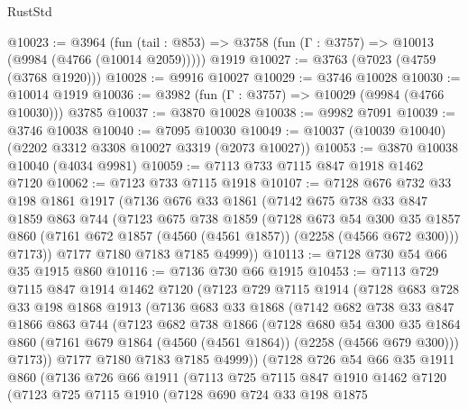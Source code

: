 \begin{lexlean}{RustStd}
\begin{coremodule}
@10023 := @3964
    (fun (tail : @853) => @3758 (fun (Γ : @3757) => @10013 (@9984 (@4766 (@10014 @2059)))))
    @1919
@10027 := @3763 (@7023 (@4759 (@3768 @1920)))
@10028 := @9916 @10027
@10029 := @3746 @10028
@10030 := @10014 @1919
@10036 := @3982 (fun (Γ : @3757) => @10029 (@9984 (@4766 @10030))) @3785
@10037 := @3870 @10028
@10038 := @9982 @7091
@10039 := @3746 @10038
@10040 := @7095 @10030
@10049 := @10037 (@10039 @10040) (@2202 @3312 @3308 @10027 @3319 (@2073 @10027))
@10053 := @3870 @10038 @10040 (@4034 @9981)
@10059 := @7113 @733 @7115 @847 @1918 @1462 @7120
@10062 := @7123 @733 @7115 @1918
@10107 := @7128
    @676
    @732
    @33
    @198
    @1861
    @1917
    (@7136
      @676
      @33
      @1861
      (@7142
        @675
        @738
        @33
        @847
        @1859
        @863
        @744
        (@7123
          @675
          @738
          @1859
          (@7128
            @673
            @54
            @300
            @35
            @1857
            @860
            (@7161 @672 @1857 (@4560 (@4561 @1857)) (@2258 (@4566 @672 @300)))
            @7173))
        @7177
        @7180
        @7183
        @7185
        @4999))
@10113 := @7128 @730 @54 @66 @35 @1915 @860
@10116 := @7136 @730 @66 @1915
@10453 := @7113
    @729
    @7115
    @847
    @1914
    @1462
    @7120
    (@7123
      @729
      @7115
      @1914
      (@7128
        @683
        @728
        @33
        @198
        @1868
        @1913
        (@7136
          @683
          @33
          @1868
          (@7142
            @682
            @738
            @33
            @847
            @1866
            @863
            @744
            (@7123
              @682
              @738
              @1866
              (@7128
                @680
                @54
                @300
                @35
                @1864
                @860
                (@7161 @679 @1864 (@4560 (@4561 @1864)) (@2258 (@4566 @679 @300)))
                @7173))
            @7177
            @7180
            @7183
            @7185
            @4999))
        (@7128
          @726
          @54
          @66
          @35
          @1911
          @860
          (@7136
            @726
            @66
            @1911
            (@7113
              @725
              @7115
              @847
              @1910
              @1462
              @7120
              (@7123
                @725
                @7115
                @1910
                (@7128
                  @690
                  @724
                  @33
                  @198
                  @1875

\end{coremodule}
\end{lexlean}
